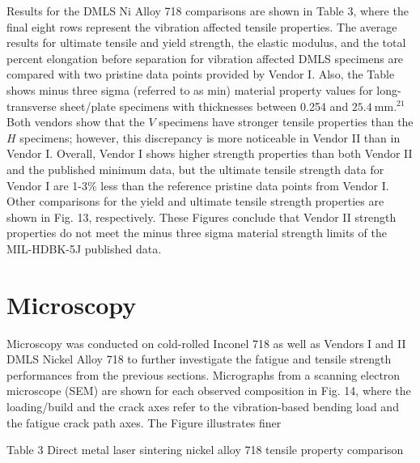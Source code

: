\documentclass[10pt]{article}
\begin{document}
Results for the DMLS Ni Alloy 718 comparisons are shown in Table 3, where the final eight rows represent the vibration affected tensile properties. The average results for ultimate tensile and yield strength, the elastic modulus, and the total percent elongation before separation for vibration affected DMLS specimens are compared with two pristine data points provided by Vendor I. Also, the Table shows minus three sigma (referred to as min) material property values for long-transverse sheet/plate specimens with thicknesses between 0.254 and $25.4 \mathrm{~mm} .{ }^{21}$ Both vendors show that the $V$ specimens have stronger tensile properties than the $H$ specimens; however, this discrepancy is more noticeable in Vendor II than in Vendor I. Overall, Vendor I shows higher strength properties than both Vendor II and the published minimum data, but the ultimate tensile strength data for Vendor I are 1-3\% less than the reference pristine data points from Vendor I. Other comparisons for the yield and ultimate tensile strength properties are shown in Fig. 13, respectively. These Figures conclude that Vendor II strength properties do not meet the minus three sigma material strength limits of the MIL-HDBK-5J published data.

\section*{Microscopy}
Microscopy was conducted on cold-rolled Inconel 718 as well as Vendors I and II DMLS Nickel Alloy 718 to further investigate the fatigue and tensile strength performances from the previous sections. Micrographs from a scanning electron microscope (SEM) are shown for each observed composition in Fig. 14, where the loading/build and the crack axes refer to the vibration-based bending load and the fatigue crack path axes. The Figure illustrates finer

Table 3 Direct metal laser sintering nickel alloy 718 tensile property comparison
\end{document}
